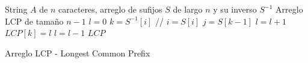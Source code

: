 \newpage

\begin{algorithm}
\begin{algorithmic}[1]
\REQUIRE String $A$ de $n$ caracteres, arreglo de sufijos $S$ de largo $n$ y su inverso $S^{-1}$ 
\ENSURE Arreglo LCP de tamaño $n-1$
\STATE $l = 0$
	\STATE $k = S^{-1}[i]$ // $i = S[i]$
	\STATE $j = S[k-1]$
    	\STATE $l = l+1$
	\ENDWHILE
	\STATE $LCP[k] = l$
		\STATE $l = l - 1$
	\ENDIF
\ENDFOR
\RETURN $LCP$
\end{algorithmic}
\caption{Arreglo LCP - Longest Common Prefix} \label{alg:algoritmo4}
\end{algorithm}